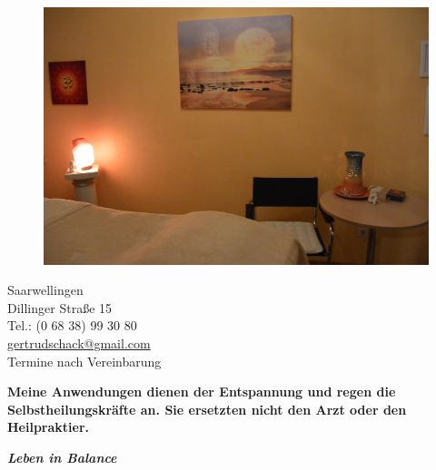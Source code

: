 \documentclass[10pt,foldmark,notumble]{leaflet}
\begin{document}
\begin{figure}[h]
\includegraphics [scale=.12]{Raum_neu.jpg}
\end{figure}


\vspace*{7mm}
\begin{flushleft}
Saarwellingen\\
Dillinger Straße 15\\
Tel.: (0 68 38) 99 30 80\\
\href{mailto:gertrudschack@gmail.com}{gertrudschack@gmail.com} \\
\vspace{2mm}
\large{Termine nach Vereinbarung} %
\end{flushleft}

{\bf Meine Anwendungen dienen der Entspannung und \mbox{regen} die Selbstheilungskräfte an. Sie ersetzten nicht den Arzt oder den Heilpraktier. }


\newpage

\centerline {\LARGE {\bf \it {Leben in Balance}}}
\end{document}
